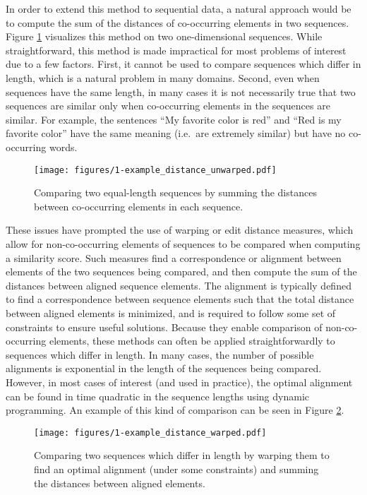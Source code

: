 In order to extend this method to sequential data, a natural approach would be to compute the sum of the distances of co-occurring elements in two sequences.
Figure \ref{fig:example_distance_unwarped} visualizes this method on two one-dimensional sequences.
While straightforward, this method is made impractical for most problems of interest due to a few factors.
First, it cannot be used to compare sequences which differ in length, which is a natural problem in many domains.
Second, even when sequences have the same length, in many cases it is not necessarily true that two sequences are similar only when co-occurring elements in the sequences are similar.
For example, the sentences ``My favorite color is red'' and ``Red is my favorite color'' have the same meaning (i.e.\ are extremely similar) but have no co-occurring words.

\begin{figure}
  \texttt{[image: figures/1-example\_distance\_unwarped.pdf]}
  \caption{Comparing two equal-length sequences by summing the distances between co-occurring elements in each sequence.}
  \label{fig:example_distance_unwarped}
\end{figure}

These issues have prompted the use of warping or edit distance measures, which allow for non-co-occurring elements of sequences to be compared when computing a similarity score.
Such measures find a correspondence or alignment between elements of the two sequences being compared, and then compute the sum of the distances between aligned sequence elements.
The alignment is typically defined to find a correspondence between sequence elements such that the total distance between aligned elements is minimized, and is required to follow some set of constraints to ensure useful solutions.
Because they enable comparison of non-co-occurring elements, these methods can often be applied straightforwardly to sequences which differ in length.
In many cases, the number of possible alignments is exponential in the length of the sequences being compared.
However, in most cases of interest (and used in practice), the optimal alignment can be found in time quadratic in the sequence lengths using dynamic programming.
An example of this kind of comparison can be seen in Figure \ref{fig:example_distance_warped}.

\begin{figure}
  \texttt{[image: figures/1-example\_distance\_warped.pdf]}
  \caption{Comparing two sequences which differ in length by warping them to find an optimal alignment (under some constraints) and summing the distances between aligned elements.}
  \label{fig:example_distance_warped}
\end{figure}

